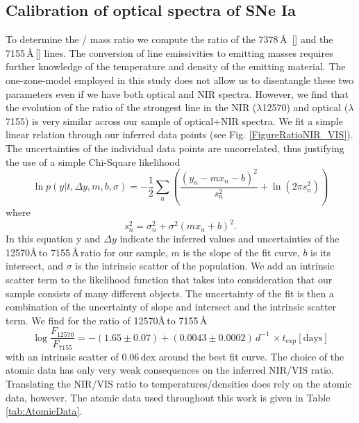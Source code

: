 \documentclass[fleqn,usenatbib]{mnras}
\begin{document}
\subsection{Calibration of optical spectra of SNe Ia}
\label{Calibration}
To determine the  /  mass ratio we compute the ratio of the $7378$\,\AA\, [] and the 7155\,\AA\,[] lines. The conversion of line emissivities to emitting masses requires further knowledge of the temperature and density of the emitting material. The one-zone-model employed in this study does not allow us to disentangle these two parameters even if we have both optical and NIR spectra. However, we find that the evolution of the ratio of the strongest  line in the NIR ($\lambda$12570) and optical ($\lambda$7155) is very similar across our sample of optical+NIR spectra. We fit a simple linear relation through our inferred data points (see Fig. \ref{FigureRatioNIR_VIS}). The uncertainties of the individual data points are uncorrelated, thus justifying the use of a simple Chi-Square likelihood
\small
\begin{equation}
    \ln p(y|t, \Delta y, m, b, \sigma) = -\frac{1}{2}\sum_n \left( \frac{(y_n -mx_n -b)^2}{s_n^2} + \ln(2\pi s_n^2)\right)
\end{equation}
\normalsize
where
\begin{equation}
    s_n^2 = \sigma_n^2 + \sigma^2(mx_n+b)^2.
\end{equation}
In this equation y and $\Delta y$ indicate the inferred values and uncertainties of the  12570\AA\,to 7155\,\AA\,ratio for our sample, $m$ is the slope of the fit curve, $b$ is its intersect, and $\sigma$ is the intrinsic scatter of the population.
We add an intrinsic scatter term to the likelihood function that takes into consideration that our sample consists of many different objects. The uncertainty of the fit is then a combination of the uncertainty of slope and intersect and the intrinsic scatter term.
We find for the ratio of  12570\AA\,to 7155\,\AA
\small
\begin{equation}
    \label{EquationNIROPT}
    \log\frac{F_{12570}}{F_{7155}} = -(1.65\pm0.07) + (0.0043\pm0.0002)\,d^{-1}\,\times t_{\text{exp}}[\text{days}]
\end{equation}
\normalsize
with an intrinsic scatter of 0.06\,dex around the best fit curve. The choice of the atomic data has only very weak consequences on the inferred NIR/VIS ratio. Translating the NIR/VIS ratio to temperatures/densities does rely on the atomic data, however. The atomic data used throughout this work is given in Table \ref{tab:AtomicData}.
\end{document}
